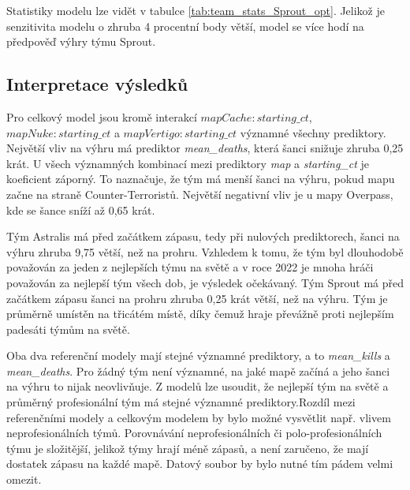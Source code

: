 Statistiky modelu lze vidět v tabulce \ref{tab:team_stats_Sprout_opt}. Jelikož je senzitivita modelu o zhruba 4 procentní body větší,
model se více hodí na předpověď výhry týmu Sprout.

\subsection{Interpretace výsledků}
Pro celkový model jsou kromě interakcí $mapCache:starting\_ct$, $mapNuke:starting\_ct$ a $mapVertigo:starting\_ct$ významné všechny prediktory. Největší vliv na výhru má
prediktor \textit{mean\_deaths}, která šanci snižuje zhruba 0,25 krát. U všech významných kombinací mezi prediktory \textit{map} a \textit{starting\_ct} je koeficient
záporný. To naznačuje, že tým má menší šanci na výhru, pokud mapu začne na straně Counter-Terroristů. Největší negativní vliv je u mapy Overpass, kde se šance
sníží až 0,65 krát.

Tým Astralis má před začátkem zápasu, tedy při nulových prediktorech, šanci na výhru zhruba 9,75 větší, než na prohru. Vzhledem k tomu, že tým byl dlouhodobě považován
za jeden z nejlepších týmu na světě a v roce 2022 je mnoha hráči považován za nejlepší tým všech dob, je výsledek očekávaný. Tým Sprout má před začátkem zápasu 
šanci na prohru zhruba 0,25 krát větší, než na výhru. Tým je průměrně umístěn na třicátém místě, díky čemuž hraje převážně proti nejlepším padesáti týmům na světě.

Oba dva referenční modely mají stejné významné prediktory, a to \textit{mean\_kills} a \textit{mean\_deaths}. Pro žádný tým není významné, na jaké mapě začíná a jeho šanci
na výhru to nijak neovlivňuje. Z modelů lze usoudit, že nejlepší tým na světě a průměrný profesionální tým má stejné významné prediktory.Rozdíl mezi referenčními modely a 
celkovým modelem by bylo možné vysvětlit např. vlivem neprofesionálních týmů. Porovnávání neprofesionálních či polo-profesionálních týmu je složitější, jelikož týmy 
hrají méně zápasů, a není zaručeno, že mají dostatek zápasu na každé mapě. Datový soubor by bylo nutné tím pádem velmi omezit.